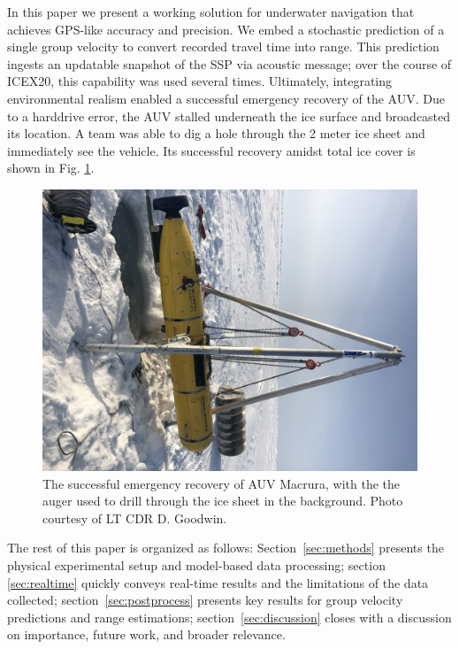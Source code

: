 In this paper we present a working solution for underwater navigation that achieves GPS-like accuracy and precision.
We embed a stochastic prediction of a single group velocity to convert recorded travel time into range.
This prediction ingests an updatable snapshot of the SSP via acoustic message; over the course of ICEX20, this capability was used several times. 
Ultimately, integrating environmental realism enabled a successful emergency recovery of the AUV.
Due to a harddrive error, the AUV stalled underneath the ice surface and broadcasted its location.
A team was able to dig a hole through the 2 meter ice sheet and immediately see the vehicle.
Its successful recovery amidst total ice cover is shown in Fig. \ref{fig:vehicleRecovery}.
\begin{figure}[h!]
	\centering
	\includegraphics[width=\reprintcolumnwidth]{figs/Fig1.jpg}
	\caption{The successful emergency recovery of AUV Macrura, with the the auger used to drill through the ice sheet in the background. Photo courtesy of LT CDR D. Goodwin.}
	\label{fig:vehicleRecovery}
\end{figure} 

The rest of this paper is organized as follows: Section~\ref{sec:methods} presents the physical
experimental setup and model-based data processing; 
section \ref{sec:realtime} quickly conveys real-time results and the limitations of the data collected; section~\ref{sec:postprocess} presents key results for group velocity predictions and range estimations; section~\ref{sec:discussion} closes with a discussion on importance, future work, and broader relevance.

